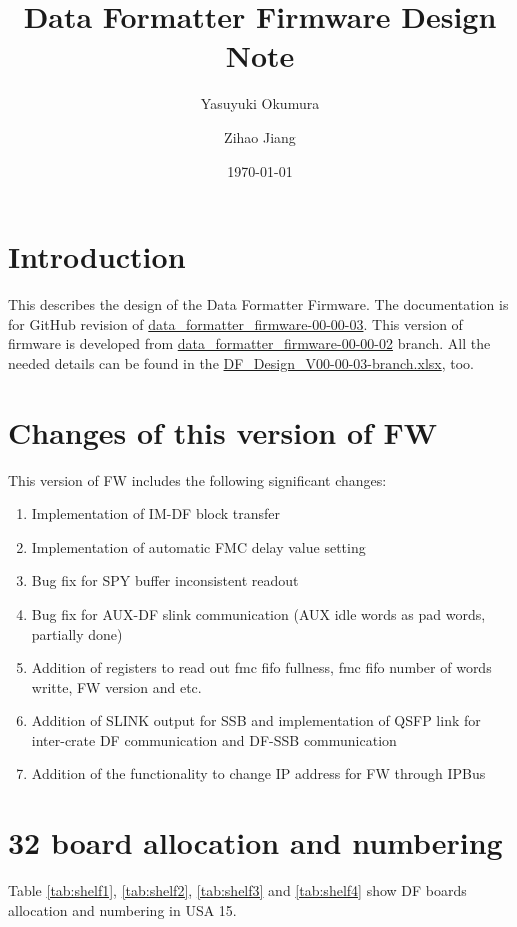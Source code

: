 \documentclass[11pt,letterpaper]{article}
\title{\bf Data Formatter Firmware Design Note}
\author{Yasuyuki Okumura}
\affil{University of Chicago, Chicago, Illinois 60637, USA}
\author{Zihao Jiang}
\affil{Stanford University, Stanford, California, 94305, USA}
\date{\today}
\begin{document}
\maketitle

\begin{abstract}
\end{abstract}

\section{Introduction}
This describes the design of the Data Formatter Firmware. The documentation is for GitHub revision of \url{data_formatter_firmware-00-00-03}. This version of firmware is developed from \url{data_formatter_firmware-00-00-02} branch. All the needed details can be found in the \url{DF_Design_V00-00-03-branch.xlsx}, too.

\section{Changes of this version of FW}
This version of FW includes the following significant changes:
\begin{enumerate}
 \item Implementation of IM-DF block transfer 
 \item Implementation of automatic FMC delay value setting
 \item Bug fix for SPY buffer inconsistent readout
 \item Bug fix for AUX-DF slink communication (AUX idle words as pad words, partially done)
 \item Addition of registers to read out fmc fifo fullness, fmc fifo number of words writte, FW version and etc.
 \item Addition of SLINK output for SSB and implementation of QSFP link for inter-crate DF communication and DF-SSB communication
 \item Addition of the functionality to change IP address for FW through IPBus
\end{enumerate}


\section{32 board allocation and numbering}

Table \ref{tab:shelf1}, \ref{tab:shelf2}, \ref{tab:shelf3} and \ref{tab:shelf4} show DF boards allocation and numbering in USA 15. 
\end{document}
